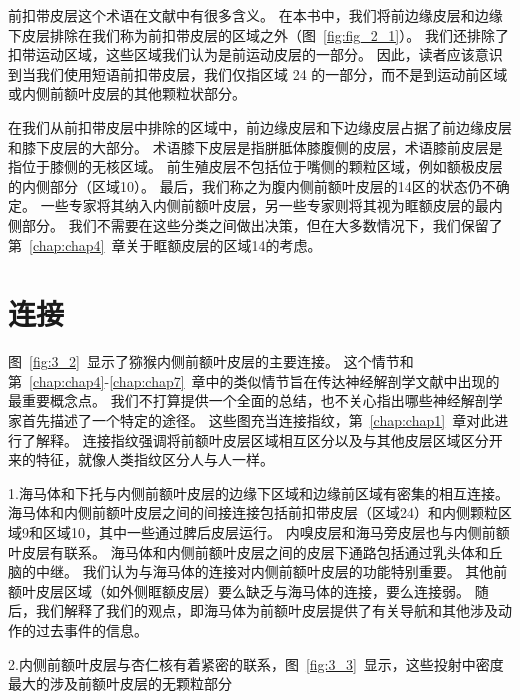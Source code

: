 前扣带皮层这个术语在文献中有很多含义。
在本书中，我们将前边缘皮层和边缘下皮层排除在我们称为前扣带皮层的区域之外（图~\ref{fig:fig_2_1}）。
我们还排除了扣带运动区域，这些区域我们认为是前运动皮层的一部分。
因此，读者应该意识到当我们使用短语前扣带皮层，我们仅指区域 24 的一部分，而不是到运动前区域或内侧前额叶皮层的其他颗粒状部分。\par


在我们从前扣带皮层中排除的区域中，前边缘皮层和下边缘皮层占据了前边缘皮层和膝下皮层的大部分。
术语膝下皮层是指胼胝体膝腹侧的皮层，术语膝前皮层是指位于膝侧的无核区域。
前生殖皮层不包括位于嘴侧的颗粒区域，例如额极皮层的内侧部分（区域10）。
最后，我们称之为腹内侧前额叶皮层的14区的状态仍不确定。
一些专家将其纳入内侧前额叶皮层，另一些专家则将其视为眶额皮层的最内侧部分。
我们不需要在这些分类之间做出决策，但在大多数情况下，我们保留了第~\ref{chap:chap4}~章关于眶额皮层的区域14的考虑。\par



\section{连接}

图~\ref{fig:3_2}~显示了猕猴内侧前额叶皮层的主要连接。
这个情节和第~\ref{chap:chap4}-\ref{chap:chap7}~章中的类似情节旨在传达神经解剖学文献中出现的最重要概念点。
我们不打算提供一个全面的总结，也不关心指出哪些神经解剖学家首先描述了一个特定的途径。
这些图充当连接指纹，第~\ref{chap:chap1}~章对此进行了解释。
连接指纹强调将前额叶皮层区域相互区分以及与其他皮层区域区分开来的特征，就像人类指纹区分人与人一样。\par


1.海马体和下托与内侧前额叶皮层的边缘下区域和边缘前区域有密集的相互连接\cite{insausti2001cortical}。
海马体和内侧前额叶皮层之间的间接连接包括前扣带皮层（区域24）和内侧颗粒区域9和区域10，其中一些通过脾后皮层运行\cite{kobayashi2003macaque}。
内嗅皮层和海马旁皮层也与内侧前额叶皮层有联系\cite{kondo2003differential,munoz2005cortical}。
海马体和内侧前额叶皮层之间的皮层下通路包括通过乳头体和丘脑的中继。
我们认为与海马体的连接对内侧前额叶皮层的功能特别重要。
其他前额叶皮层区域（如外侧眶额皮层）要么缺乏与海马体的连接，要么连接弱\cite{carmichael1995limbic}。
随后，我们解释了我们的观点，即海马体为前额叶皮层提供了有关导航和其他涉及动作的过去事件的信息。


2.内侧前额叶皮层与杏仁核有着紧密的联系，图~\ref{fig:3_3}~显示，这些投射中密度最大的涉及前额叶皮层的无颗粒部分\par


